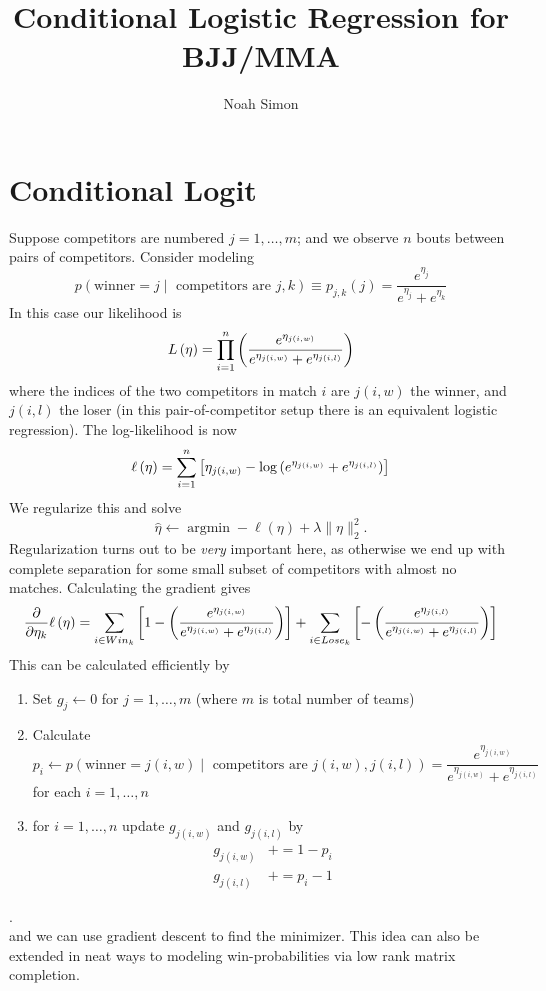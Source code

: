 \documentclass[useAMS,referee,usenatbib]{amsart}
\title{Conditional Logistic Regression for BJJ/MMA}
\author{Noah Simon}
\begin{document}
\label{firstpage}

\maketitle

\section{Conditional Logit}\label{sec:intro}
Suppose competitors are numbered $j=1,\ldots, m$; and we observe $n$ bouts between pairs of competitors. Consider modeling 
\[
p\left(\textrm{winner} = j \middle| \textrm{ competitors are } j,k\right) \equiv p_{j,k}(j) = \frac{e^{\eta_j}}{e^{\eta_j}+e^{\eta_k}}
\]
In this case our likelihood is
\[
L\left({\bf \eta}\right) = \prod_{i=1}^n \left(\frac{e^{\eta_{j(i,w)}}}{e^{\eta_{j(i,w)}} + e^{\eta_{j(i,l)}}}\right)
\]
where the indices of the two competitors in match $i$ are $j(i,w)$ the winner, and $j(i,l)$ the loser (in this pair-of-competitor setup there is an equivalent logistic regression). The log-likelihood is now
\[
\ell\left({\bf \eta}\right) = \sum_{i=1}^n\left[\eta_{j(i,w)} - \operatorname{log}\left(e^{\eta_{j(i,w)}} + e^{\eta_{j(i,l)}}\right)\right]
\]
We regularize this and solve
\[
\hat{\eta}\gets \operatorname{argmin}-\ell(\eta) + \lambda\|\eta\|_2^2.
\]
Regularization turns out to be \emph{very} important here, as otherwise we end up with complete separation for some small subset of competitors with almost no matches. Calculating the gradient gives
\[
\frac{\partial}{\partial \eta_k}\ell\left({\bf \eta}\right) = \sum_{i\in Win_k}\left[1 -  \left(\frac{e^{\eta_{j(i,w)}}}{e^{\eta_{j(i,w)}} + e^{\eta_{j(i,l)}}}\right)\right] + \sum_{i\in Lose_k}\left[-\left(\frac{e^{\eta_{j(i,l)}}}{e^{\eta_{j(i,w)}} + e^{\eta_{j(i,l)}}}\right) \right] 
\]
This can be calculated efficiently by\\

\hline
\begin{enumerate}
\item Set $g_j \gets 0$ for $j = 1,\ldots, m$ (where $m$ is total number of teams)\\

\item Calculate
\[
p_i\gets p\left(\textrm{winner} = j(i,w) \middle| \textrm{ competitors are } j(i,w),j(i,l)\right) = \frac{e^{\eta_{j(i,w)}}}{e^{\eta_{j(i,w)}} + e^{\eta_{j(i,l)}}}
\]
for each $i=1,\ldots,n$\\

\item for $i=1,\ldots,n$ update $g_{j(i,w)}$ and $g_{j(i,l)}$ by
\begin{align*}
g_{j(i,w)} &+= 1 - p_i\\
g_{j(i,l)} &+= p_i - 1
\end{align*}
\end{enumerate}
\hline
.\\

and we can use gradient descent to find the minimizer.  This idea can also be extended in neat ways to modeling win-probabilities via low rank matrix completion.
\end{document}
